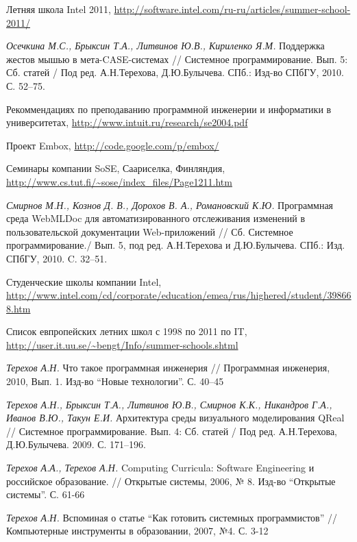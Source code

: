 \documentclass[a5paper]{article}
\begin{document}
\begin{thebibliography}{9001}
   Летняя школа Intel 2011, \url{http://software.intel.com/ru-ru/articles/summer-school-2011/}

  \emph{Осечкина М.С., Брыксин Т.А., Литвинов Ю.В., Кириленко Я.М.} 
   Поддержка жестов мышью в мета-CASE-системах // Системное программирование. 
   Вып. 5: Сб. статей / Под ред. А.Н.Терехова, Д.Ю.Булычева.  СПб.: Изд-во 
   СПбГУ, 2010. С. 52--75.
  
   Рекоммендациях по преподаванию программной инженерии и информатики в университетах, \url{http://www.intuit.ru/research/se2004.pdf}
  

   Проект Embox, \url{http://code.google.com/p/embox/}
  
   Семинары компании SoSE, Саариселка, Финляндия, \url{http://www.cs.tut.fi/~sose/index_files/Page1211.htm}
  
  \emph{Смирнов М.Н., Кознов Д. В., Дорохов В. А., Романовский К.Ю.} 
   Программная среда WebMLDoc для автоматизированного отслеживания изменений в 
   пользовательской документации Web-приложений // Сб. Системное 
   программирование./ Вып. 5, под ред. А.Н.Терехова и Д.Ю.Булычева. СПб.: Изд. 
   СПбГУ, 2010. C. 32--51.
  
   Студенческие школы компании Intel, \url{http://www.intel.com/cd/corporate/education/emea/rus/highered/student/398668.htm}
  
   Список  евпропейских летних школ с 1998 по 2011 по IT, \url{http://user.it.uu.se/~bengt/Info/summer-schools.shtml}

  \emph{Терехов А.Н.}
  Что такое программная инженерия // Программная инженерия, 2010, Вып. 1. Изд-во ``Новые технологии''. С. 40--45

   \emph{Терехов А.Н., Брыксин Т.А., Литвинов Ю.В., Смирнов К.К., Никандров  Г.А., Иванов В.Ю., Такун Е.И.} 
   Архитектура среды визуального  моделирования QReal // Системное программирование. 
   Вып. 4: Сб. статей  / Под ред. А.Н.Терехова, Д.Ю.Булычева. 2009. С. 171--196.

  \emph{Терехов А.А., Терехов А.Н.}
  Computing Curricula: Software Engineering и российское образование. // Открытые системы, 2006, № 8. Изд-во ``Открытые системы''. С. 61-66

  \emph{Терехов А.Н.}
  Вспоминая о статье ``Как готовить системных программистов'' // Компьютерные инструменты в образовании, 2007, №4. С. 3-12


\end{thebibliography}
\end{document}
